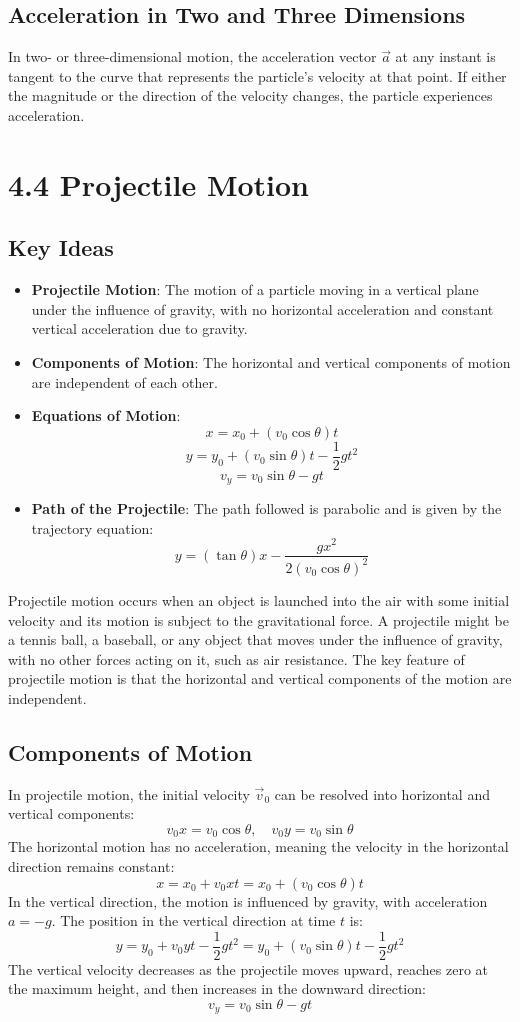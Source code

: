 \documentclass{article}
\begin{document}
\subsection*{Acceleration in Two and Three Dimensions}
In two- or three-dimensional motion, the acceleration vector $\vec{a}$ at any instant is tangent to the curve that represents the particle's velocity at that point. If either the magnitude or the direction of the velocity changes, the particle experiences acceleration.

\section*{4.4 Projectile Motion}
\subsection*{Key Ideas}
\begin{itemize}
    \item \textbf{Projectile Motion}: The motion of a particle moving in a vertical plane under the influence of gravity, with no horizontal acceleration and constant vertical acceleration due to gravity.
    \item \textbf{Components of Motion}: The horizontal and vertical components of motion are independent of each other.
    \item \textbf{Equations of Motion}:
    \[
    x = x_0 + (v_0 \cos \theta)t
    \]
    \[
    y = y_0 + (v_0 \sin \theta)t - \frac{1}{2} g t^2
    \]
    \[
    v_y = v_0 \sin \theta - g t
    \]
    \item \textbf{Path of the Projectile}: The path followed is parabolic and is given by the trajectory equation:
    \[
    y = ( \tan \theta) x - \frac{g x^2}{2 (v_0 \cos \theta)^2}
    \]
\end{itemize}
Projectile motion occurs when an object is launched into the air with some initial velocity and its motion is subject to the gravitational force. A projectile might be a tennis ball, a baseball, or any object that moves under the influence of gravity, with no other forces acting on it, such as air resistance. The key feature of projectile motion is that the horizontal and vertical components of the motion are independent.

\subsection*{Components of Motion}

In projectile motion, the initial velocity $\vec{v}_0$ can be resolved into horizontal and vertical components:
\[
v_0x = v_0 \cos \theta, \quad v_0y = v_0 \sin \theta
\]
The horizontal motion has no acceleration, meaning the velocity in the horizontal direction remains constant:
\[
x = x_0 + v_0x t = x_0 + (v_0 \cos \theta)t
\]
In the vertical direction, the motion is influenced by gravity, with acceleration $a = -g$. The position in the vertical direction at time $t$ is:
\[
y = y_0 + v_0y t - \frac{1}{2} g t^2 = y_0 + (v_0 \sin \theta)t - \frac{1}{2} g t^2
\]
The vertical velocity decreases as the projectile moves upward, reaches zero at the maximum height, and then increases in the downward direction:
\[
v_y = v_0 \sin \theta - g t
\]
\end{document}
